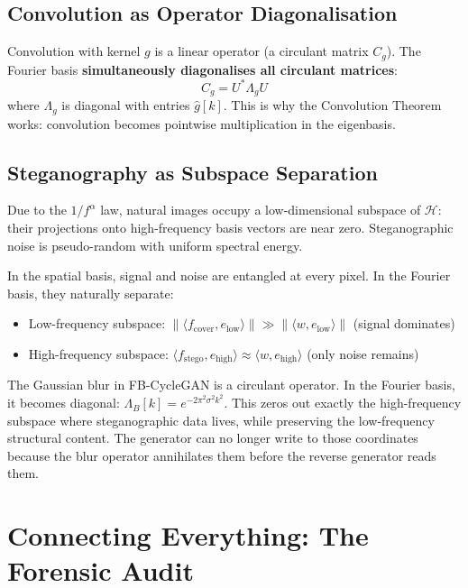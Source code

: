 \documentclass[11pt,a4paper]{article}
\theoremstyle{definition}
\begin{document}
\subsection{Convolution as Operator Diagonalisation}

Convolution with kernel $g$ is a linear operator (a circulant matrix $C_g$). The Fourier basis \textbf{simultaneously diagonalises all circulant matrices}:
\begin{equation}
    C_g = U^* \Lambda_g U
\end{equation}
where $\Lambda_g$ is diagonal with entries $\hat{g}[k]$. This is why the Convolution Theorem works: convolution becomes pointwise multiplication in the eigenbasis.

\subsection{Steganography as Subspace Separation}

Due to the $1/f^\alpha$ law, natural images occupy a low-dimensional subspace of $\mathcal{H}$: their projections onto high-frequency basis vectors are near zero. Steganographic noise is pseudo-random with uniform spectral energy.

In the spatial basis, signal and noise are entangled at every pixel. In the Fourier basis, they naturally separate:
\begin{itemize}
    \item Low-frequency subspace: $\|\langle f_{\text{cover}}, e_{\text{low}}\rangle\| \gg \|\langle w, e_{\text{low}}\rangle\|$ (signal dominates)
    \item High-frequency subspace: $\langle f_{\text{stego}}, e_{\text{high}}\rangle \approx \langle w, e_{\text{high}}\rangle$ (only noise remains)
\end{itemize}

\begin{connection}
The Gaussian blur in FB-CycleGAN is a circulant operator. In the Fourier basis, it becomes diagonal: $\Lambda_B[k] = e^{-2\pi^2\sigma^2 k^2}$. This zeros out exactly the high-frequency subspace where steganographic data lives, while preserving the low-frequency structural content. The generator can no longer write to those coordinates because the blur operator annihilates them before the reverse generator reads them.
\end{connection}

\section{Connecting Everything: The Forensic Audit}
\end{document}
